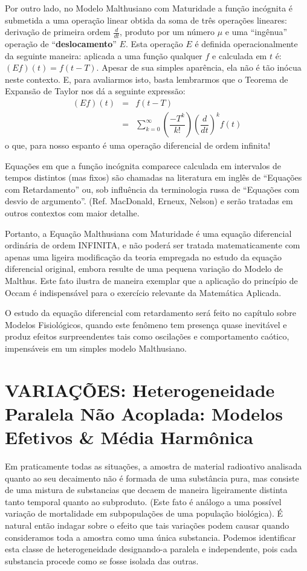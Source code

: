     Por outro lado, no Modelo Malthusiano com Maturidade a função incógnita é submetida a uma operação linear obtida da soma de três operações lineares: derivação de primeira ordem \(\frac{d}{dt}\), produto por um número \(\mu\) e uma ``ingênua'' operação de ``\textbf{deslocamento}'' \(E\). Esta operação \(E\) é definida operacionalmente da seguinte maneira: aplicada a uma função qualquer \(f\) e calculada em \(t\) é: \((Ef)(t) = f(t-T)\). Apesar de sua simples aparência, ela não é tão inócua neste contexto. E, para avaliarmos isto, basta lembrarmos que o Teorema de Expansão de Taylor nos dá a seguinte expressão:
    \begin{eqnarray}
    (Ef)(t) &=& f(t-T) \nonumber \\
    &=& \displaystyle\sum_{k=0}^{\infty} \left(\dfrac{-T^k}{k!}\right) \left(\dfrac{d}{dt}\right)^k f(t)
    \end{eqnarray} 
    o que, para nosso espanto é uma operação diferencial de ordem infinita! 
    
    Equações em que a função incógnita comparece calculada em intervalos de tempos distintos (mas fixos) são chamadas na literatura em inglês de ``Equações com Retardamento'' ou, sob influência da terminologia russa de ``Equações com desvio de argumento''. (Ref. MacDonald, Erneux, Nelson) e serão tratadas em outros contextos com maior detalhe. 

    Portanto, a Equação Malthusiana com Maturidade é uma equação diferencial ordinária de ordem INFINITA, e não poderá ser tratada matematicamente com apenas uma ligeira modificação da teoria empregada no estudo da equação diferencial original, embora resulte de uma pequena variação do Modelo de Malthus. Este fato ilustra de maneira exemplar que a aplicação do princípio de Occam é indispensável para o exercício relevante da Matemática Aplicada.

    O estudo da equação diferencial com retardamento será feito no capítulo sobre Modelos Fisiológicos, quando este fenômeno tem presença quase inevitável e produz efeitos surpreendentes tais como oscilações e comportamento caótico, impensáveis em um simples modelo Malthusiano. 

\section{VARIAÇÕES: Heterogeneidade Paralela Não Acoplada: Modelos Efetivos \& Média Harmônica}

    Em praticamente todas as situações, a amostra de material radioativo analisada quanto ao seu decaimento não é formada de uma substância pura, mas consiste de uma mistura de substancias que decaem de maneira ligeiramente distinta tanto temporal quanto ao subproduto. (Este fato é análogo a uma possível variação de mortalidade em subpopulações de uma população biológica). É natural então indagar sobre o efeito que tais variações podem causar quando consideramos toda a amostra como uma única substancia. Podemos identificar esta classe de heterogeneidade designando-a paralela e independente, pois cada substancia procede como se fosse isolada das outras.
    
